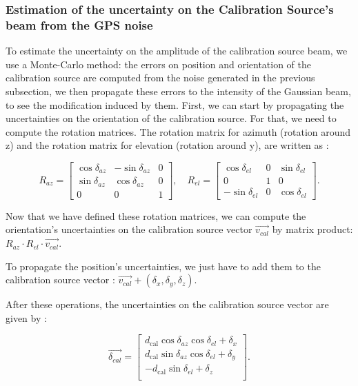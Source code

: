 \documentclass[../../thesis.tex]{subfiles}
\begin{document}
\subsubsection{Estimation of the uncertainty on the Calibration Source's beam from the GPS noise}

To estimate the uncertainty on the amplitude of the calibration source beam, we use a Monte-Carlo method: the errors on position and orientation of the calibration source are computed from the noise generated in the previous subsection, we then propagate these errors to the intensity of the Gaussian beam, to see the modification induced by them.
First, we can start by propagating the uncertainties on the orientation of the calibration source. For that, we need to compute the rotation matrices. The rotation matrix for azimuth (rotation around z) and the rotation matrix for elevation (rotation around y), are written as :

\begin{equation}
    R_{az} =
    \begin{bmatrix}
        \cos\delta_{az} & -\sin\delta_{az} & 0 \\
        \sin\delta_{az} & \cos\delta_{az}  & 0 \\
        0               & 0                & 1
    \end{bmatrix},
    \quad
    R_{el} =
    \begin{bmatrix}
        \cos\delta_{el}  & 0 & \sin\delta_{el} \\
        0                & 1 & 0               \\
        -\sin\delta_{el} & 0 & \cos\delta_{el}
    \end{bmatrix}.
\end{equation}

Now that we have defined these rotation matrices, we can compute the orientation's uncertainties on the calibration source vector $\vec{v_{cal}}$ by matrix product: $R_{az} \cdot R_{el} \cdot \vec{v_{cal}}$.

To propagate the position's uncertainties, we just have to add them to the calibration source vector : $\vec{v_{cal}} + (\delta_x, \delta_y, \delta_z)$.

After these operations, the uncertainties on the calibration source vector are given by :

\begin{equation}
    \vec{\delta_{cal}} =
    \begin{bmatrix}
        d_{\text{cal}} \cos\delta_{az}\cos\delta_{el} + \delta_x \\
        d_{\text{cal}} \sin\delta_{az}\cos\delta_{el} + \delta_y \\
        - d_{\text{cal}} \sin\delta_{el} + \delta_z              \\
    \end{bmatrix}.
\end{equation}
\end{document}
